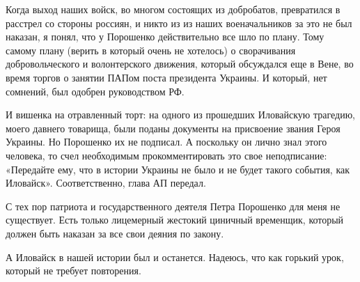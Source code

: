 Когда выход наших войск, во многом состоящих из добробатов, превратился в
расстрел со стороны россиян, и никто из из наших военачальников за это не был
наказан, я понял, что у Порошенко действительно все шло по плану. Тому самому
плану (верить в который очень не хотелось) о сворачивания добровольческого и
волонтерского движения, который обсуждался еще в Вене, во время торгов о
занятии ПАПом поста президента Украины. И который, нет сомнений, был одобрен
руководством РФ.

И вишенка на отравленный торт: на одного из прошедших Иловайскую трагедию,
моего давнего товарища, были поданы документы на присвоение звания Героя
Украины. Но Порошенко их не подписал. А поскольку он лично знал этого человека,
то счел необходимым прокомментировать это свое неподписание: «Передайте ему,
что в истории Украины не было и не будет такого события, как Иловайск».
Соответственно, глава АП передал.

С тех пор патриота и государственного деятеля Петра Порошенко для меня не
существует. Есть только лицемерный жестокий циничный временщик, который должен
быть наказан за все свои деяния по закону.

А Иловайск в нашей истории был и останется. Надеюсь, что как горький урок,
который не требует повторения.
